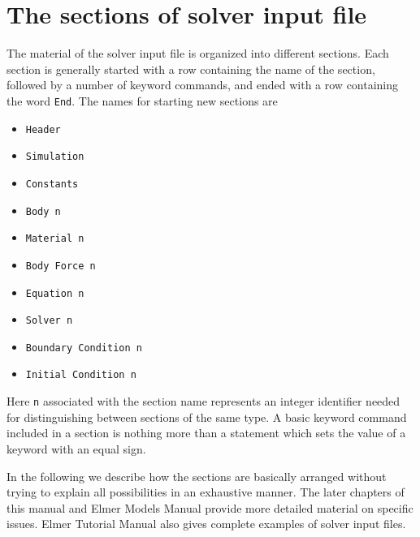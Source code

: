                                                                                                                  

\section{The sections of solver input file}

The material of the solver input file is organized into different sections.  
Each section is generally started with a row containing the name of the section, followed by a number of
keyword commands, and ended with a row containing the word {\tt End}. 
The names for starting new sections are
\begin{itemize}
\item {\tt Header}
\item {\tt Simulation}
\item {\tt Constants}
\item {\tt Body n}
\item {\tt Material n}
\item {\tt Body Force n}
\item {\tt Equation n}
\item {\tt Solver n}
\item {\tt Boundary Condition n}
\item {\tt Initial Condition n}
\end{itemize}
Here {\tt n} associated with the section name represents an integer identifier needed for distinguishing between 
sections of the same type. A basic keyword command included in a section
is nothing more than a statement which sets the value of a keyword
with an equal sign. 

In the following we describe how the sections are basically arranged without 
trying to explain all possibilities in an exhaustive manner. 
The later chapters of this manual and Elmer Models Manual provide more
detailed material on specific issues. Elmer Tutorial Manual also gives complete
examples of solver input files. 

